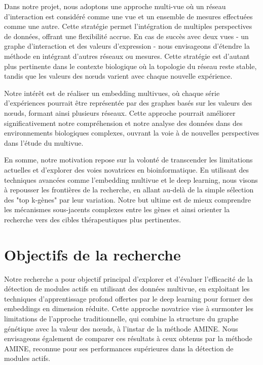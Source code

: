 Dans notre projet, nous adoptons une approche multi-vue où un réseau d'interaction est considéré comme une vue et un ensemble de mesures effectuées comme une autre. Cette stratégie permet l'intégration de multiples perspectives de données, offrant une flexibilité accrue. En cas de succès avec deux vues - un graphe d'interaction et des valeurs d'expression - nous envisageons d'étendre la méthode en intégrant d'autres réseaux ou mesures. Cette stratégie est d'autant plus pertinente dans le contexte biologique où la topologie du réseau reste stable, tandis que les valeurs des nœuds varient avec chaque nouvelle expérience.

Notre intérêt est de réaliser un embedding multivues, où chaque série d'expériences pourrait être représentée par des graphes basés sur les valeurs des nœuds, formant ainsi plusieurs réseaux. Cette approche pourrait améliorer significativement notre compréhension et notre analyse des données dans des environnements biologiques complexes, ouvrant la voie à de nouvelles perspectives dans l'étude du multivue.

En somme, notre motivation repose sur la volonté de transcender les limitations actuelles et d'explorer des voies novatrices en bioinformatique. En utilisant des techniques avancées comme l'embedding multivue et le deep learning, nous visons à repousser les frontières de la recherche, en allant au-delà de la simple sélection des "top k-gènes" par leur variation. Notre but ultime est de mieux comprendre les mécanismes sous-jacents complexes entre les gènes et ainsi orienter la recherche vers des cibles thérapeutiques plus pertinentes.


\section{Objectifs de la recherche}

Notre recherche a pour objectif principal d'explorer et d'évaluer l'efficacité de la détection de modules actifs en utilisant des données multivue, en exploitant les techniques d'apprentissage profond offertes par le deep learning pour former des embeddings en dimension réduite. Cette approche novatrice vise à surmonter les limitations de l'approche traditionnelle, qui combine la structure du graphe génétique avec la valeur des nœuds, à l'instar de la méthode AMINE\cite{Pasquier22}. Nous envisageons également de comparer ces résultats à ceux obtenus par la méthode AMINE, reconnue pour ses performances supérieures dans la détection de modules actifs.

